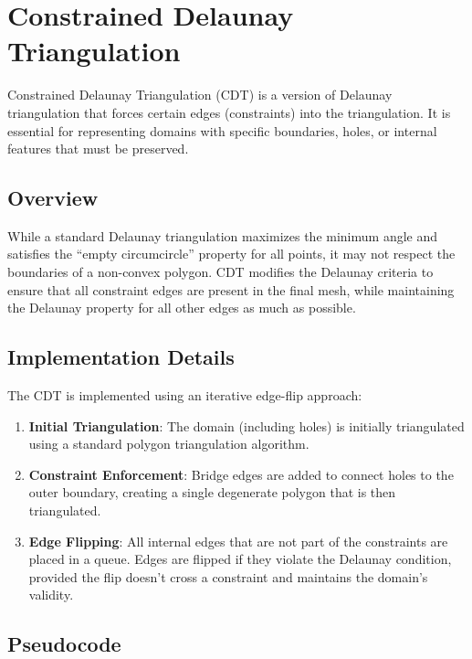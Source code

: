 \section{Constrained Delaunay Triangulation}
\label{sec:constrained_delaunay}

Constrained Delaunay Triangulation (CDT) is a version of Delaunay triangulation that forces certain edges (constraints) into the triangulation. It is essential for representing domains with specific boundaries, holes, or internal features that must be preserved.

\subsection{Overview}

While a standard Delaunay triangulation maximizes the minimum angle and satisfies the ``empty circumcircle'' property for all points, it may not respect the boundaries of a non-convex polygon. CDT modifies the Delaunay criteria to ensure that all constraint edges are present in the final mesh, while maintaining the Delaunay property for all other edges as much as possible.

\subsection{Implementation Details}

The CDT is implemented using an iterative edge-flip approach:
\begin{enumerate}
\item \textbf{Initial Triangulation}: The domain (including holes) is initially triangulated using a standard polygon triangulation algorithm.
\item \textbf{Constraint Enforcement}: Bridge edges are added to connect holes to the outer boundary, creating a single degenerate polygon that is then triangulated.
\item \textbf{Edge Flipping}: All internal edges that are not part of the constraints are placed in a queue. Edges are flipped if they violate the Delaunay condition, provided the flip doesn't cross a constraint and maintains the domain's validity.
\end{enumerate}

\subsection{Pseudocode}

